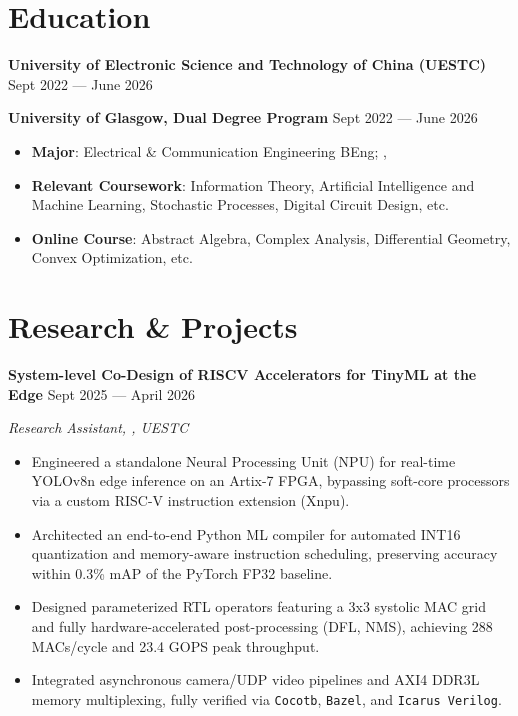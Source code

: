 \section{Education}

\textbf{University of Electronic Science and Technology of China (UESTC)} \hfill Sept 2022 --- June 2026

\textbf{University of Glasgow, Dual Degree Program} \hfill Sept 2022 --- June 2026

\begin{itemize}
    \setlength\itemsep{-0.5em}
    \setlength\topsep{0pt}
    \setlength\partopsep{0pt}
    \item \textbf{Major}: Electrical \& Communication Engineering BEng; , 
    \item \textbf{Relevant Coursework}: Information Theory, Artificial Intelligence and Machine Learning, Stochastic Processes, Digital Circuit Design, etc.
    \item \textbf{Online Course}: Abstract Algebra, Complex Analysis, Differential Geometry, Convex Optimization, etc.
\end{itemize}


\section{Research \& Projects}

\textbf{System-level Co-Design of RISCV Accelerators for TinyML at the Edge} \hfill Sept 2025 --- April 2026

\vspace{-0.5em} \begin{small} \textit{Research Assistant, , UESTC} \end{small} \vspace{-0.5em}

\begin{itemize}
    \setlength\itemsep{-0.5em}
    \setlength\topsep{0pt}
    \setlength\partopsep{0pt}
    \item Engineered a standalone Neural Processing Unit (NPU) for real-time YOLOv8n edge inference on an Artix-7 FPGA, bypassing soft-core processors via a custom RISC-V instruction extension (Xnpu).
    \item Architected an end-to-end Python ML compiler for automated INT16 quantization and memory-aware instruction scheduling, preserving accuracy within 0.3\% mAP of the PyTorch FP32 baseline.
    \item Designed parameterized RTL operators featuring a 3x3 systolic MAC grid and fully hardware-accelerated post-processing (DFL, NMS), achieving 288 MACs/cycle and 23.4 GOPS peak throughput.
    \item Integrated asynchronous camera/UDP video pipelines and AXI4 DDR3L memory multiplexing, fully verified via \texttt{Cocotb}, \texttt{Bazel}, and \texttt{Icarus Verilog}.
\end{itemize}

